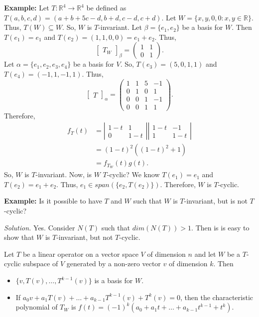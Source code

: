 \documentclass[12pt]{article}
\newenvironment{theorem}[2][Theorem]{\begin{trivlist}
\item[\hskip \labelsep {\bfseries #1}\hskip \labelsep {\bfseries #2.}]}{\end{trivlist}}
\begin{document}
\noindent\textbf{Example:} Let $T : \mathbb{R}^4 \to \mathbb{R}^4$ be defined as $T(a,b,c,d) = (a + b + 5c - d, b + d, c - d, c + d)$. Let $W = \{ x, y, 0, 0 : x,y \in \mathbb{R}\}$. Thus, $T(W) \subseteq W$. So, $W$ is $T$-invariant. Let $\beta = \{e_1, e_2\}$ be a basis for $W$. Then $T(e_1) = e_1$ and $T(e_2) = (1, 1, 0, 0) = e_1 + e_2$. Thus, $$\begin{bmatrix}
T_W
\end{bmatrix}_\beta = \begin{pmatrix}
1 & 1 \\ 0 & 1
\end{pmatrix}.$$ Let $\alpha = \{e_1, e_2, e_3, e_4\}$ be a basis for $V$. So, $T(e_3) = (5, 0, 1, 1)$ and $T(e_4) = (-1, 1, -1, 1)$. Thus, $$\begin{bmatrix}
T
\end{bmatrix}_\alpha = \left( \begin{array}{cc|cc}
     1 & 1 & 5 & -1 \\ 0 & 1 & 0 & 1 \\ \hline 0 & 0 & 1 & -1 \\ 0 & 0 & 1 & 1
\end{array} \right).$$ Therefore, \begin{align*}
    f_T(t) &= \left| \begin{array}{cc}
    1-t & 1 \\ 0 & 1-t
    \end{array} \right| \left| \begin{array}{cc}
    1-t & -1 \\ 1 & 1-t
    \end{array} \right| \\
    &= (1-t)^2((1-t)^2+1) \\
    &= f_{T_W}(t)g(t).
\end{align*} So, $W$ is $T$-invariant. Now, is $W$ $T$-cyclic? We know $T(e_1) = e_1$ and $T(e_2) = e_1 + e_2$. Thus, $e_1 \in span(\{e_2, T(e_2)\})$. Therefore, $W$ is $T$-cyclic.

\vspace{1em}

\noindent\textbf{Example:} Is it possible to have $T$ and $W$ such that $W$ is $T$-invariant, but is not $T$-cyclic?

\textit{Solution.} Yes. Consider $N(T)$ such that $dim(N(T)) > 1$. Then is is easy to show that $W$ is $T$-invariant, but not $T$-cyclic.

\begin{theorem}{5.22}
Let $T$ be a linear operator on a vector space $V$ of dimension $n$ and let $W$ be a $T$-cyclic subspace of $V$ generated by a non-zero vector $v$ of dimension $k$. Then

\begin{itemize}
    \item[(a)] $\{v, T(v), \dots, T^{k - 1}(v)\}$ is a basis for $W$. 
    
    \item[(b)] If $a_0v + a_1T(v) + \dots + a_{k-1}T^{k-1}(v) + T^k(v) = 0$, then the characteristic polynomial of $T_W$ is $f(t) = (-1)^k(a_0 + a_1t + \dots + a_{k-1}t^{k-1} + t^k)$.
\end{itemize}
\end{theorem}
\end{document}

